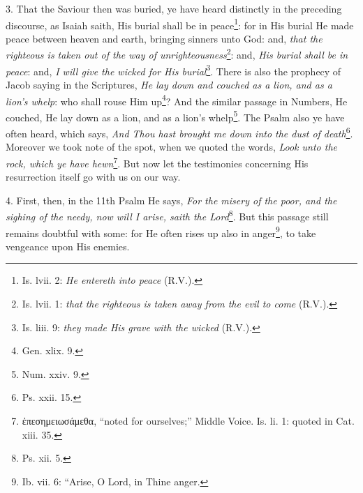3. That the Saviour then was buried, ye have heard distinctly in the preceding discourse, as Isaiah saith, His burial shall be in peace\footnote{Is. lvii. 2: \emph{He entereth into peace} (R.V.).}: for in His burial He made peace between heaven and earth, bringing sinners unto God: and, \emph{that the righteous is taken out of the way of unrighteousness}\footnote{Is. lvii. 1: \emph{that the righteous is taken away from the evil to come} (R.V.).}: and, \emph{His burial shall be in peace}: and, \emph{I will give the wicked for His burial}\footnote{Is. liii. 9: \emph{they made His grave with the wicked} (R.V.).}. There is also the prophecy of Jacob saying in the Scriptures, \emph{He lay down and couched as a lion, and as a lion’s whelp}: who shall rouse Him up\footnote{Gen. xlix. 9.}? And the similar passage in Numbers, He couched, He lay down as a lion, and as a lion’s whelp\footnote{Num. xxiv. 9.}. The Psalm also ye have often heard, which says, \emph{And Thou hast brought me down into the dust of death}\footnote{Ps. xxii. 15.}. Moreover we took note of the spot, when we quoted the words, \emph{Look unto the rock, which ye have hewn}\footnote{\textgreek{ἐπεσημειωσάμεθα}, “noted for ourselves;” Middle Voice. Is. li. 1: quoted in Cat. xiii. 35.}. But now let the testimonies concerning His resurrection itself go with us on our way.

4. First, then, in the 11th Psalm He says, \emph{For the misery of the poor, and the sighing of the needy, now will I arise, saith the Lord}\footnote{Ps. xii. 5.}. But this passage still remains doubtful with some: for He often rises up also in anger\footnote{Ib. vii. 6: “Arise, O Lord, in Thine anger.}, to take vengeance upon His enemies.

